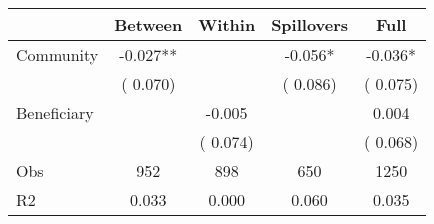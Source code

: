
\begin{tabular}{l*{4}{c}}\hline&\multicolumn{1}{c}{Between}&\multicolumn{1}{c}{Within}&\multicolumn{1}{c}{Spillovers}&\multicolumn{1}{c}{Full}\\ \hline
 Community             &             -0.027**      &                                               &       -0.056* &        -0.036*                            \\ 
                               &        (       0.070)           &                                       &       (       0.086)     &      (       0.075)                                           \\ 
 Beneficiary   &                                               &       -0.005    &                                &             0.004                            \\ 
                               &                                               & (       0.074)                  &                                        &      (       0.068)                                           \\ 
\hline                                                                                                                                                                                                                                            
 Obs                   &               952               &       898                       &       650                &              1250                                               \\ 
 R2                    &                      0.033              &              0.000                      &              0.060               &                     0.035                                              \\ 
\hline \end{tabular}                                                                                                                                                                                                              